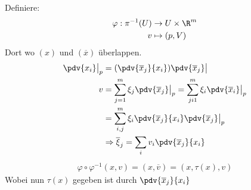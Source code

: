 Definiere:
\begin{align}
\varphi: \pi^{-1} (U) &\to U \times \R^m\\
v &\mapsto (p, V)
\end{align}
Dort wo $(x)$ und $(\overline{x})$ überlappen.
\begin{align}
\pdv{x_i} \big\vert_p &= (\pdv{\overline{x}_j}{x_i})\pdv{\overline{x}_j} \big\vert\\
v &= \sum_{j=1}^{m} \xi_j \pdv{\overline{x}_j}  \big\vert_p = \sum_{ji1}^{m} \xi_i \pdv{\overline{x}_i}  \big\vert_p \\
&= \sum_{i, j}^{m} \xi_i \pdv{\overline{x}_j}{x_i}  \pdv{\overline{x}_j}\big\vert_p\\
&\Rightarrow \overline{\xi}_j = \sum_i v_i \pdv{\overline{x}_j}{x_i}
\end{align}
\begin{align}
\varphi \circ \varphi^{-1}(x, v) = (x, \overline{v}) = (x, \tau(x), v)
\end{align}
Wobei nun $\tau(x)$ gegeben ist durch $\pdv{\overline{x}_j}{x_i}$